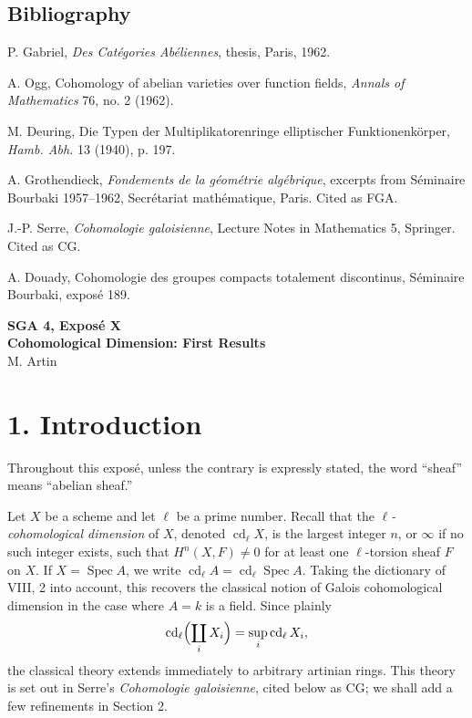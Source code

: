 \documentclass[11pt]{article}
\newcommand{\Spec}{\operatorname{Spec}}
\begin{document}
\subsection*{Bibliography}
\begin{enumerate}[label={[\arabic*]}]
\item P. Gabriel, \emph{Des Cat\'egories Ab\'eliennes}, thesis, Paris, 1962.
\item A. Ogg, Cohomology of abelian varieties over function fields, \emph{Annals of Mathematics} 76, no. 2 (1962).
\item M. Deuring, Die Typen der Multiplikatorenringe elliptischer Funktionenk\"orper, \emph{Hamb. Abh.} 13 (1940), p. 197.
\item A. Grothendieck, \emph{Fondements de la g\'eom\'etrie alg\'ebrique}, excerpts from S\'eminaire Bourbaki 1957--1962, Secr\'etariat math\'ematique, Paris. Cited as FGA.
\item J.-P. Serre, \emph{Cohomologie galoisienne}, Lecture Notes in Mathematics 5, Springer. Cited as CG.
\item A. Douady, Cohomologie des groupes compacts totalement discontinus, S\'eminaire Bourbaki, expos\'e 189.
\end{enumerate}


\clearpage
\begin{center}
{\Large \textbf{SGA 4, Expos\'e X}}\\[0.35em]
{\large \textbf{Cohomological Dimension: First Results}}\\[0.25em]
{\normalsize M. Artin}
\end{center}

\bigskip

\section*{1. Introduction}
Throughout this expos\'e, unless the contrary is expressly stated, the word ``sheaf'' means ``abelian sheaf.''

Let \(X\) be a scheme and let \(\ell\) be a prime number. Recall that the \emph{\(\ell\)-cohomological dimension} of \(X\), denoted \(\operatorname{cd}_\ell X\), is the largest integer \(n\), or \(\infty\) if no such integer exists, such that \(H^n(X,F)\ne0\) for at least one \(\ell\)-torsion sheaf \(F\) on \(X\). If \(X=\Spec A\), we write \(\operatorname{cd}_\ell A=\operatorname{cd}_\ell\Spec A\). Taking the dictionary of VIII, 2 into account, this recovers the classical notion of Galois cohomological dimension in the case where \(A=k\) is a field. Since plainly
\[
\operatorname{cd}_\ell\Bigl(\coprod_iX_i\Bigr)=\sup_i\operatorname{cd}_\ell X_i,
\]
the classical theory extends immediately to arbitrary artinian rings. This theory is set out in Serre's \emph{Cohomologie galoisienne}, cited below as CG; we shall add a few refinements in Section 2.
\end{document}
